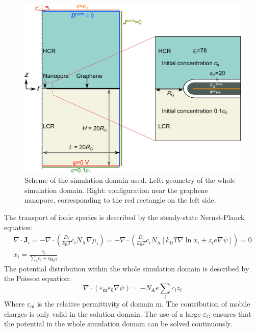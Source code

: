 \documentclass[journal=langd5,email=true, hyperref=true, keywords=false]{achemso}
\begin{document}
\begin{figure}[htbp]
  \centering
  \includegraphics[width=0.8\linewidth]{img/SI-numerical-1.png}
  \caption{Scheme of the simulation domain used. Left: geometry of the
    whole simulation domain. Right: configuration near the graphene
    nanopore, corresponding to the red rectangle on the left side.}
  \label{fig:scheme}
\end{figure}

The transport of ionic species is described by the steady-state
Nernst-Planck equation:
\begin{eqnarray}
  \label{eq:pnp}
  \nabla \cdot \boldsymbol{J}_{i} = -\nabla \cdot \left( \frac{D_{i}}{k_{\mathrm{B}}T} c_{i} N_{\mathrm{A}} \nabla \mu_{i}\right)
  = -\nabla \cdot \left( \frac{D_{i}}{k_{\mathrm{B}} T} c_{i} N_{\mathrm{A}}
  [k_{\mathrm{B}}T \nabla \ln x_{i} + z_{i} e \nabla \psi]\right) = 0\\
  x_{i} = \frac{c_{i}}{\sum_{i} c_{i} + c_{\mathrm{H_{2}O}}}
\end{eqnarray}
The potential distribution within the whole simulation domain is
described by the Poisson equation:
\begin{equation}
  \label{eq:poisson}
  \nabla \cdot (\varepsilon_{\mathrm{m}} \varepsilon_{0} \nabla \psi) = -N_{\mathrm{A}} e \sum_{i} c_{i}z_{i}
\end{equation}
Where $\varepsilon_{\mathrm{m}}$ is the relative permittivity of
domain m. The contribution of mobile charges is only valid in the
solution domain. The use of a large $\varepsilon_{\mathrm{G}}$ ensures
that the potential in the whole simulation domain can be solved
continuously. 
\end{document}
